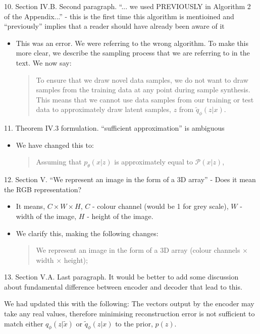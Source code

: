 \documentclass{article}
\begin{document}
{\color{blue}
10. Section IV.B. Second paragraph. ``... we used PREVIOUSLY in Algorithm 2 of the Appendix...'' - this is the first time this algorithm is mentioined and ``previously'' implies that a reader should have already been aware of it}
\begin{itemize}
    \item This was an error. We were referring to the wrong algorithm. To make this more clear, we describe the sampling process that we are referring to in the text. We now say:
    \begin{quote}
        To ensure that we draw novel data samples, we do not want to draw samples from the training data at any point during sample synthesis. This means that we cannot use data samples from our training or test data to approximately draw latent samples, $z$ from $\tilde{q}_\phi(z|x)$.
    \end{quote} 
\end{itemize}

{\color{blue}
11. Theorem IV.3 formulation. ``sufficient approximation'' is ambiguous}
\begin{itemize}
    \item We have changed this to:
    \begin{quote}
        Assuming that $p_\theta(x|z)$ is approximately equal to $\mathcal{P}(x|z)$,
    \end{quote}
\end{itemize}

{\color{blue}
12. Section V. ``We represent an image in the form of a 3D array'' - Does it mean the RGB representation?}
\begin{itemize}
    \item It means, $C \times W \times H$, $C$ - colour channel (would be 1 for grey scale), $W$ - width of the image, $H$ - height of the image.
    \item We clarify this, making the following changes:
    \begin{quote}
        We represent an image in the form of a $3$D array (colour channels $\times$ width $\times$ height);
    \end{quote}
\end{itemize}

{\color{blue}
13. Section V.A. Last paragraph. It would be better to add some discussion about fundamental difference between encoder and decoder that lead to this.}

{\color{red}
We had updated this with the following:
The vectors output by the encoder may take any real values, therefore minimising reconstruction error is not sufficient to match either $q_\phi(z|\tilde{x})$ or $\tilde{q}_\phi(z|x)$ to the prior, $p(z)$. 
}\\
\end{document}
